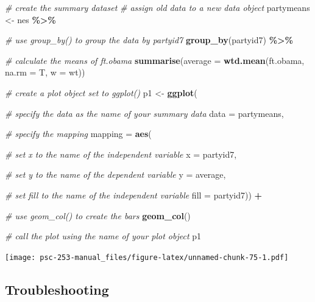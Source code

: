 \documentclass[
]{book}
\newenvironment{Shaded}{\begin{snugshade}}{\end{snugshade}}
\newcommand{\AttributeTok}[1]{\textcolor[rgb]{0.13,0.29,0.53}{#1}}
\newcommand{\CommentTok}[1]{\textcolor[rgb]{0.56,0.35,0.01}{\textit{#1}}}
\newcommand{\FunctionTok}[1]{\textcolor[rgb]{0.13,0.29,0.53}{\textbf{#1}}}
\newcommand{\NormalTok}[1]{#1}
\newcommand{\OtherTok}[1]{\textcolor[rgb]{0.56,0.35,0.01}{#1}}
\newcommand{\SpecialCharTok}[1]{\textcolor[rgb]{0.81,0.36,0.00}{\textbf{#1}}}
\begin{document}
\begin{Shaded}
\begin{Highlighting}[]
\CommentTok{\# create the summary dataset}
\CommentTok{\# assign old data to a new data object}
\NormalTok{partymeans }\OtherTok{\textless{}{-}}\NormalTok{ nes }\SpecialCharTok{\%\textgreater{}\%}
  
  \CommentTok{\# use group\_by() to group the data by partyid7}
  \FunctionTok{group\_by}\NormalTok{(partyid7) }\SpecialCharTok{\%\textgreater{}\%}
  
  \CommentTok{\# calculate the means of ft.obama}
  \FunctionTok{summarise}\NormalTok{(}\AttributeTok{average =} \FunctionTok{wtd.mean}\NormalTok{(ft.obama, }\AttributeTok{na.rm =}\NormalTok{ T,}
                               \AttributeTok{w =}\NormalTok{ wt))}

\CommentTok{\# create a plot object set to \textasciigrave{}ggplot()\textasciigrave{}}
\NormalTok{p1 }\OtherTok{\textless{}{-}} \FunctionTok{ggplot}\NormalTok{(}
  
  \CommentTok{\# specify the data as the name of your summary data}
  \AttributeTok{data =}\NormalTok{ partymeans,}
  
  \CommentTok{\# specify the mapping}
  \AttributeTok{mapping =} \FunctionTok{aes}\NormalTok{(}
    
    \CommentTok{\# set x to the name of the independent variable}
    \AttributeTok{x =}\NormalTok{ partyid7,}
    
    \CommentTok{\# set y to the name of the dependent variable}
    \AttributeTok{y =}\NormalTok{ average,}
    
    \CommentTok{\# set \textasciigrave{}fill\textasciigrave{} to the name of the independent variable}
    \AttributeTok{fill =}\NormalTok{ partyid7)) }\SpecialCharTok{+}
  
  \CommentTok{\# use \textasciigrave{}geom\_col() to create the bars}
  \FunctionTok{geom\_col}\NormalTok{()}

\CommentTok{\# call the plot using the name of your plot object}
\NormalTok{p1}
\end{Highlighting}
\end{Shaded}

\texttt{[image: psc-253-manual\_files/figure-latex/unnamed-chunk-75-1.pdf]}

\hypertarget{troubleshooting-28}{%
\subsection{Troubleshooting}\label{troubleshooting-28}}
\end{document}
